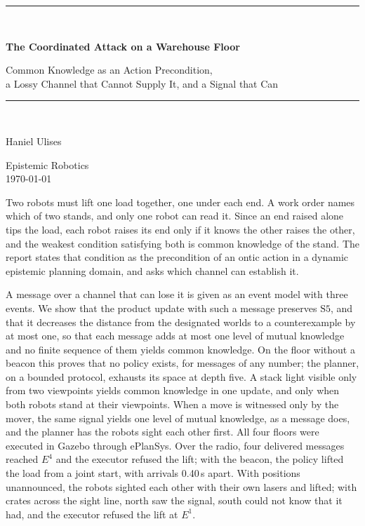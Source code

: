 \documentclass[11pt,a4paper]{article}
\theoremstyle{definition}
\begin{document}
\begin{titlepage}
\centering
\vspace*{2.4cm}
{\color{rulegrey}\rule{\textwidth}{0.8pt}}\\[0.9cm]
{\LARGE\bfseries The Coordinated Attack on a Warehouse Floor\par}
\vspace{0.5cm}
{\large\color{slate} Common Knowledge as an Action Precondition,\\
a Lossy Channel that Cannot Supply It, and a Signal that Can\par}
\vspace{0.7cm}
{\color{rulegrey}\rule{\textwidth}{0.8pt}}\\[1.4cm]

{\large Haniel Ulises\par}
\vspace{0.3cm}
{\color{slate} Epistemic Robotics}\\
\vspace{0.15cm}
{\color{slate}\today}

\vfill
{\color{slate}\small
Two robots must lift one load together, one under each end. A work order names
which of two stands, and only one robot can read it. Since an end raised alone
tips the load, each robot raises its end only if it knows the other raises the
other, and the weakest condition satisfying both is common knowledge of the
stand. The report states that condition as the precondition of an ontic action
in a dynamic epistemic planning domain, and asks which channel can establish it.

\vspace{0.6em}
A message over a channel that can lose it is given as an event model with three
events. We show that the product update with such a message preserves
$\mathrm{S5}$, and that it decreases the distance from the designated worlds to
a counterexample by at most one, so that each message adds at most one level of
mutual knowledge and no finite sequence of them yields common knowledge. On the
floor without a beacon this proves that no policy exists, for messages of any
number; the planner, on a bounded protocol, exhausts its space at depth five.
A stack light visible only from two viewpoints yields common knowledge in one
update, and only when both robots stand at their viewpoints. When a move is
witnessed only by the mover, the same signal yields one level of mutual
knowledge, as a message does, and the planner has the robots sight each other
first. All four floors were
executed in Gazebo through ePlanSys. Over the radio, four delivered messages
reached $E^4$ and the executor refused the lift; with the beacon, the policy
lifted the load from a joint start, with arrivals 0.40\,s apart. With positions
unannounced, the robots sighted each other with their own lasers and lifted;
with crates across the sight line, north saw the signal, south could not know
that it had, and the executor refused the lift at $E^1$.}
\vspace{1.2cm}
\end{titlepage}
\end{document}
